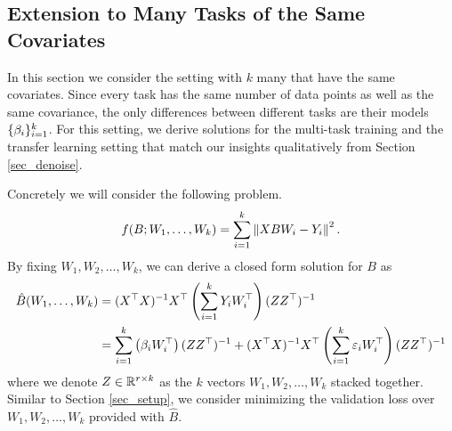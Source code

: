 \subsection{Extension to Many Tasks of the Same Covariates}

In this section we consider the setting with $k$ many that have the same covariates.
Since every task has the same number of data points as well as the same covariance, the only differences between different tasks are their models $\{\beta_i\}_{i=1}^k$.
For this setting, we derive solutions for the multi-task training and the transfer learning setting that match our insights qualitatively from Section \ref{sec_denoise}.

Concretely we will consider the following problem.
\begin{align}
	f(B; W_1, \dots, W_k) = \sum_{i=1}^k \left\| X B W_i - Y_i \right\|^2. \label{eq_mtl_same_cov}
\end{align}
By fixing $W_1, W_2, \dots, W_k$, we can derive a closed form solution for $B$ as
\begin{align*}
	\hat{B}(W_1, \dots, W_k) &= (X^{\top}X)^{-1} X^{\top} \left({\sum_{i=1}^k Y_i W_i^{\top}}\right) (Z Z^{\top})^{-1} \\
	&= \sum_{i=1}^k \left({\beta_i W_i^{\top}}\right) (ZZ^{\top})^{-1} + (X^{\top}X)^{-1}X^{\top} \left({\sum_{i=1}^k \varepsilon_i W_i^{\top}}\right) (ZZ^{\top})^{-1}
\end{align*}
where we denote $Z\in\mathbb{R}^{r\times k}$ as the $k$ vectors $W_1, W_2, \dots, W_k$ stacked together.
Similar to Section \ref{sec_setup}, we consider minimizing the validation loss over $W_1, W_2, \dots, W_k$ provided with $\hat{B}$.

